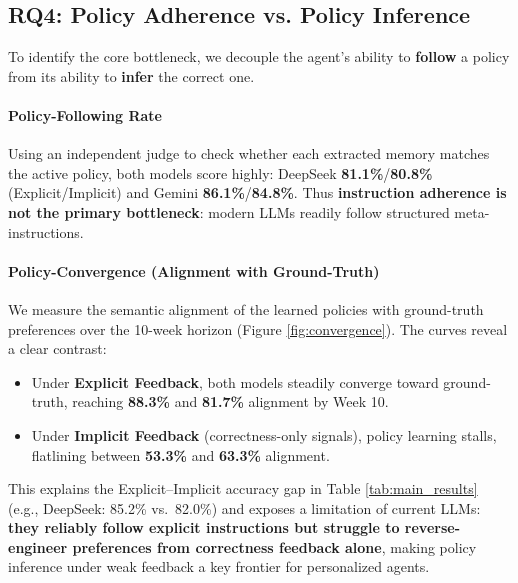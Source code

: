 \documentclass[11pt]{article}
\begin{document}
\subsection{RQ4: Policy Adherence vs. Policy Inference}
To identify the core bottleneck, we decouple the agent's ability to \textbf{follow} a policy from its ability to \textbf{infer} the correct one.

\paragraph{Policy-Following Rate}
Using an independent judge to check whether each extracted memory matches the active policy, both models score highly: DeepSeek \textbf{81.1\%}/\textbf{80.8\%} (Explicit/Implicit) and Gemini \textbf{86.1\%}/\textbf{84.8\%}. Thus \textbf{instruction adherence is not the primary bottleneck}: modern LLMs readily follow structured meta-instructions.

\paragraph{Policy-Convergence (Alignment with Ground-Truth)}
We measure the semantic alignment of the learned policies with ground-truth preferences over the 10-week horizon (Figure \ref{fig:convergence}). The curves reveal a clear contrast:
\begin{itemize}
    \item Under \textbf{Explicit Feedback}, both models steadily converge toward ground-truth, reaching \textbf{88.3\%} and \textbf{81.7\%} alignment by Week 10.
    \item Under \textbf{Implicit Feedback} (correctness-only signals), policy learning stalls, flatlining between \textbf{53.3\%} and \textbf{63.3\%} alignment.
\end{itemize}

This explains the Explicit--Implicit accuracy gap in Table \ref{tab:main_results} (e.g., DeepSeek: 85.2\% vs.\ 82.0\%) and exposes a limitation of current LLMs: \textbf{they reliably follow explicit instructions but struggle to reverse-engineer preferences from correctness feedback alone}, making policy inference under weak feedback a key frontier for personalized agents.
\end{document}
